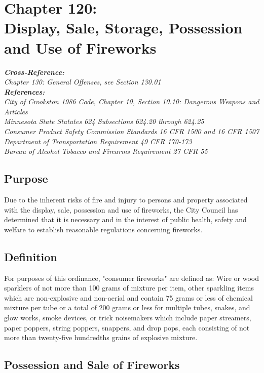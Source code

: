 \chapter*{Chapter 120: \\
	Display, Sale, Storage, Possession and Use of Fireworks}
    \vfill
    \minitoc
    \emph{\textbf{Cross-Reference:}\\
        {\indent}Chapter 130: General Offenses, see Section 130.01}\\
    \indent\emph{\textbf{References:}\\
        {\indent}City of Crookston 1986 Code, Chapter 10, Section 10.10: Dangerous Weapons and Articles\\
        {\indent}Minnesota State Statutes 624 Subsections 624.20 through 624.25\\
        {\indent}Consumer Product Safety Commission Standards 16 CFR 1500 and 16 CFR 1507\\
        {\indent}Department of Transportation Requirement 49 CFR 170-173\\
        {\indent}Bureau of Alcohol Tobacco and Firearms Requirement 27 CFR 55}
    \pagebreak

\section{Purpose}
Due to the inherent risks of fire and injury to persons and property associated with the display, sale, possession and use of fireworks, the City Council has determined that it is necessary and in the interest of public health, safety and welfare to establish reasonable regulations concerning fireworks.
\section{Definition}
For purposes of this ordinance, "consumer fireworks" are defined as: Wire or wood sparklers of not more than 100 grams of mixture per item, other sparkling items which are non-explosive and non-aerial and contain 75 grams or less of chemical mixture per tube or a total of 200 grams or less for multiple tubes, snakes, and glow works, smoke devices, or trick noisemakers which include paper streamers, paper poppers, string poppers, snappers, and drop pops, each consisting of not more than twenty-five hundredths grains of explosive mixture.
\section{Possession and Sale of Fireworks}
